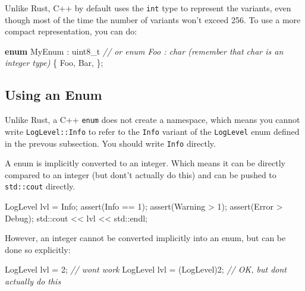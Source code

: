 \documentclass[
]{book}
\newenvironment{Shaded}{\begin{snugshade}}{\end{snugshade}}
\newcommand{\BuiltInTok}[1]{#1}
\newcommand{\CommentTok}[1]{\textcolor[rgb]{0.56,0.35,0.01}{\textit{#1}}}
\newcommand{\DataTypeTok}[1]{\textcolor[rgb]{0.13,0.29,0.53}{#1}}
\newcommand{\DecValTok}[1]{\textcolor[rgb]{0.00,0.00,0.81}{#1}}
\newcommand{\KeywordTok}[1]{\textcolor[rgb]{0.13,0.29,0.53}{\textbf{#1}}}
\newcommand{\NormalTok}[1]{#1}
\newcommand{\OtherTok}[1]{\textcolor[rgb]{0.56,0.35,0.01}{#1}}
\begin{document}
Unlike Rust, C++ by default uses the \texttt{int} type to represent the variants, even though most of the
time the number of variants won't exceed 256. To use a more compact representation, you can do:

\begin{Shaded}
\begin{Highlighting}[]
\KeywordTok{enum}\NormalTok{ MyEnum : }\DataTypeTok{uint8\_t}
\CommentTok{// or \textasciigrave{}enum Foo : char\textasciigrave{} (remember that \textasciigrave{}char\textasciigrave{} is an integer type)}
\NormalTok{\{}
\NormalTok{    Foo,}
\NormalTok{    Bar,}
\NormalTok{\};}
\end{Highlighting}
\end{Shaded}

\hypertarget{using-an-enum}{%
\subsection{Using an Enum}\label{using-an-enum}}

Unlike Rust, a C++ \texttt{enum} does not create a namespace, which means you cannot write \texttt{LogLevel::Info}
to refer to the \texttt{Info} variant of the \texttt{LogLevel} enum defined in the prevous subsection. You should
write \texttt{Info} directly.

A enum is implicitly converted to an integer. Which means it can be directly compared to an integer
(but dont't actually do this) and can be pushed to \texttt{std::cout} directly.

\begin{Shaded}
\begin{Highlighting}[]
\NormalTok{LogLevel lvl = Info;}
\OtherTok{assert}\NormalTok{(Info == }\DecValTok{1}\NormalTok{);}
\OtherTok{assert}\NormalTok{(Warning \textgreater{} }\DecValTok{1}\NormalTok{);}
\OtherTok{assert}\NormalTok{(Error \textgreater{} Debug);}
\BuiltInTok{std::}\NormalTok{cout \textless{}\textless{} lvl \textless{}\textless{} }\BuiltInTok{std::}\NormalTok{endl;}
\end{Highlighting}
\end{Shaded}

However, an integer cannot be converted implicitly into an enum, but can be done so explicitly:

\begin{Shaded}
\begin{Highlighting}[]
\NormalTok{LogLevel lvl = }\DecValTok{2}\NormalTok{;           }\CommentTok{// won\textquotesingle{}t work}
\NormalTok{LogLevel lvl = (LogLevel)}\DecValTok{2}\NormalTok{; }\CommentTok{// OK, but don\textquotesingle{}t actually do this}
\end{Highlighting}
\end{Shaded}
\end{document}
